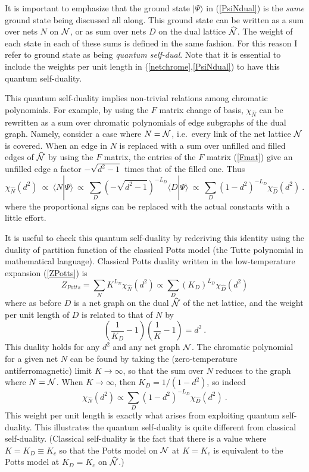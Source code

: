 \documentclass[11pt]{article}
\newcommand{\Nhat}{\widehat{\cal N}}
\begin{document}
It is important to emphasize that the ground state $|\Psi\rangle$ in
(\ref{PsiNdual}) is the {\em same} ground state being discussed all
along. This ground state can be written as a sum over nets $N$ on
${\cal N}$, or as sum over nets $D$ on the dual lattice $\Nhat$. The
weight of each state in each of these sums is defined in the same
fashion. For this reason I
refer to ground state as being {\em quantum self-dual}.  
Note that it is essential to include the weights per unit length in 
(\ref{netchrome},\ref{PsiNdual}) to have this quantum self-duality.

This quantum self-duality implies non-trivial relations among
chromatic polynomials. For example, by using the $F$ matrix change of
basis, $\chi_{\widehat{N}}$ can be rewritten as a sum over chromatic
polynomials of edge subgraphs of the dual graph. Namely, consider a
case where $N={\cal N}$, i.e.\ every link of the net lattice ${\cal N}$ is
covered.  When an edge in $N$ is replaced with a sum over unfilled and
filled edges of $\Nhat$ by using the $F$ matrix, the entries of the
$F$ matrix (\ref{Fmat}) give an unfilled edge a factor $-\sqrt{d^2-1}$
times that of the filled one. Thus
$$\chi_{\widehat{N}}(d^2)\ \propto\ \langle N|\Psi\rangle\ \propto\
\sum_{D} (-\sqrt{d^2-1})^{-L_D} \langle D|\Psi\rangle\ \propto\
\sum_D (1-d^2)^{-L_D} \chi_{\widehat{D}}(d^2)\ .
$$
where the proportional signs can be replaced with the actual
constants with a little effort.

It is useful to check this quantum self-duality by rederiving this identity 
using the duality of partition function of the classical Potts model (the
Tutte polynomial in mathematical language). Classical Potts duality
written in the low-temperature expansion (\ref{ZPotts}) is
$$Z_{Potts} = \sum_{N} K^{L_N} \chi_{\widehat{N}}(d^2) \propto
\sum_{D} (K_D)^{L_D} \chi_{\widehat{D}}(d^2)
$$ where as before $D$ is a net graph on the dual $\Nhat$ of the net
lattice, and the weight per unit length of $D$ is related to that
of $N$ by
$$\left(\frac{1}{K_D}-1\right) \left(\frac{1}{K}-1\right) = d^2\ .$$
This duality holds for any $d^2$ and any net graph ${\cal N}$. 
The chromatic polynomial for a given net $N$ can be found by taking
the (zero-temperature antiferromagnetic) limit $K\to\infty$, so that
the sum over $N$ reduces to the graph where $N={\cal N}$. When $K\to\infty$, then $K_D=1/(1-d^2)$, so indeed
$$\chi_{\widehat{N}}(d^2) \propto \sum_{D} (1-d^2)^{-L_D}
\chi_{\widehat{D}}(d^2)\ .$$ This weight per unit length is exactly
what arises from exploiting quantum self-duality. This illustrates the
quantum self-duality is quite different from classical self-duality. (Classical
self-duality is the fact that there is a value where $K=K_D\equiv K_c$
so that the Potts model on ${\cal N}$ at $K=K_c$ is equivalent to the
Potts model at $K_D=K_c$ on $\Nhat$.)
\end{document}
